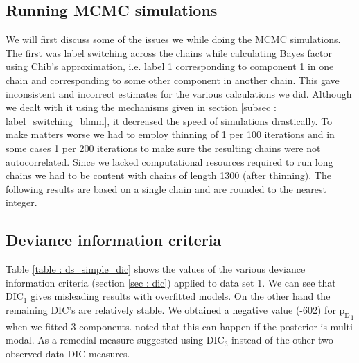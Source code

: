 \subsection{Running MCMC simulations}
We will first discuss some of the issues we while doing the MCMC simulations. The first was label switching across the chains while calculating Bayes factor using Chib's approximation, i.e. label 1 corresponding to component 1 in one chain and corresponding to some other component in another chain. This gave inconsistent and incorrect estimates for the various calculations we did. Although we dealt with it using the mechanisms given in section \ref{subsec : label_switching_blmm}, it decreased the speed of simulations drastically. To make matters worse we had to employ thinning of 1 per 100 iterations and in some cases 1 per 200 iterations to make sure the resulting chains were not autocorrelated. Since we lacked computational resources required to run long chains we had to be content with chains of length 1300 (after thinning). The following results are based on a single chain and are rounded to the nearest integer.

\subsection{Deviance information criteria}
\label{subsec : dic_simulation_results}
Table \ref{table : ds_simple_dic} shows the values of the various deviance information criteria (section \ref{sec : dic}) applied to data set 1. We can see that $\text{DIC}_1$ gives misleading results with overfitted models. On the other hand the remaining DIC's are relatively stable. We obtained a negative value (-602) for ${\text{p}_\text{D}}_1$ when we fitted 3 components. \citet[pg. 161]{lunn_bugs_2012} noted that this can happen if the posterior is multi modal. As a remedial measure \citet{celeux_deviance_2006} suggested using $\text{DIC}_3$ instead of the other two observed data DIC measures.\\

